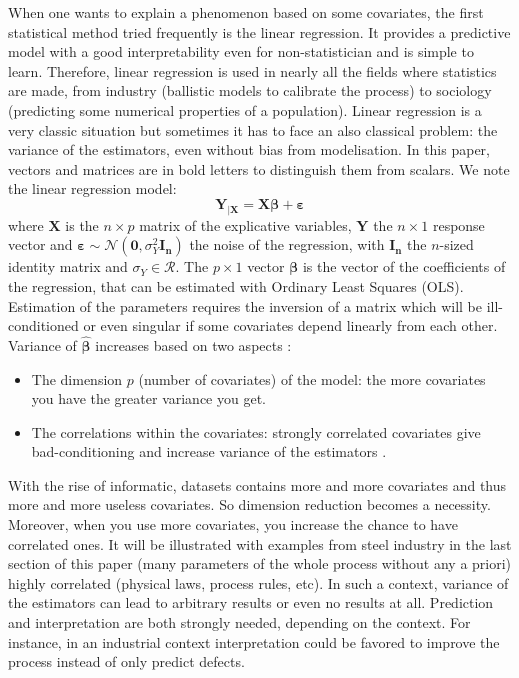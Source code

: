 \documentclass[11pt,a4paper]{article}
\begin{document}
When one wants to explain a phenomenon based on some covariates, the first statistical method tried frequently is the linear regression. It provides a predictive model with a good interpretability even  for non-statistician and is simple to learn. Therefore, linear regression is used in nearly all the fields where statistics are made, from industry (ballistic models to calibrate the process) to sociology (predicting some numerical properties of a population).
Linear regression is a very classic situation but sometimes it has to face an also classical problem: the variance of the estimators, even without bias from modelisation. 
In this paper, vectors and matrices are in bold letters to distinguish them from scalars. We note the linear regression model:
\begin{equation}
		\boldsymbol{Y}_{|\boldsymbol{X}}=\boldsymbol{X}\boldsymbol{\beta} + \boldsymbol{\varepsilon}
	\end{equation}
	where $\boldsymbol{X}$ is the $n\times p$ matrix of the explicative variables, $\boldsymbol{Y}$ the  $n\times 1$ response vector and $\boldsymbol{\varepsilon} \sim \mathcal{N}(\boldsymbol{0},\sigma_Y^2\boldsymbol{I_n})$ the noise of the regression, with $\boldsymbol{I_n}$ the $n$-sized identity matrix and $\sigma_Y \in \mathcal{R}$. The $p\times 1$ vector $\boldsymbol{\beta}$ is the vector of the coefficients of the regression, that can be estimated with Ordinary Least Squares (\textsc{OLS}). %
	Estimation of the parameters requires the inversion of a matrix which will be ill-conditioned or even singular if some covariates depend linearly from each other. 
Variance of $\boldsymbol{\hat\beta}$ increases based on two aspects :
\begin{itemize}
	\item The dimension $p$ (number of covariates) of the model: the more covariates you have the greater variance you get.
	\item The correlations within the covariates: strongly correlated covariates give bad-conditioning and increase variance of the estimators .
\end{itemize}

	With the rise of informatic, datasets contains more and more covariates and thus more and more useless covariates. So dimension reduction becomes a necessity. Moreover, when you use more covariates, you increase the chance to have correlated ones. It will be illustrated with examples from steel industry in the last section of this paper (many parameters of the whole process without any a priori) highly correlated (physical laws, process rules, etc). 
	 In such a context, variance of the estimators can lead to arbitrary results or even no results at all. Prediction and interpretation are both strongly needed, depending on the context. For instance, in an industrial context interpretation could be favored to improve the process instead of only predict defects.
		~\\	~\\
		
\end{document}
